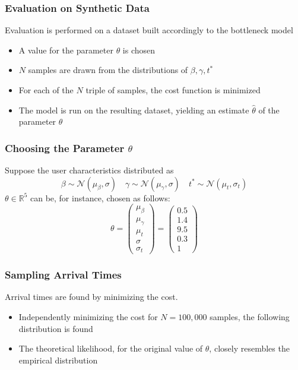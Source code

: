 \documentclass[hyperref={pdfpagelabels=false}]{beamer}
\begin{document}
\begin{frame}
  \tableofcontents[currentsection]
\end{frame}

\begin{frame}
  \frametitle{Evaluation on Synthetic Data}
  Evaluation is performed on a dataset built accordingly to the bottleneck model
  \begin{itemize}
  \item A value for the parameter \(\theta\) is chosen
  \item \(N\) samples are drawn from the distributions of \(\beta, \gamma, t^*\)
  \item For each of the \(N\) triple of samples, the cost function is minimized
  \item The model is run on the resulting dataset, yielding an estimate \(\hat{\theta}\) of the parameter \(\theta\)
  \end{itemize}
\end{frame}

\begin{frame}
  \frametitle{Choosing the Parameter $\theta$}
  Suppose the user characteristics distributed as
  \begin{equation*}
    \beta \sim \mathcal{N}(\mu_\beta, \sigma) \quad \gamma \sim \mathcal{N}(\mu_\gamma, \sigma) \quad t^* \sim \mathcal{N}(\mu_t, \sigma_t)
  \end{equation*}
  \(\theta \in \mathbb{R}^5\) can be, for instance, chosen as follows:
  \begin{equation*}
    \theta = \begin{pmatrix}
      \mu_\beta \\
      \mu_\gamma \\
      \mu_t \\
      \sigma \\
      \sigma_t
    \end{pmatrix}
    =
    \begin{pmatrix}
      0.5 \\
      1.4 \\
      9.5 \\
      0.3 \\
      1
    \end{pmatrix}
  \end{equation*}
\end{frame}

\begin{frame}
  \frametitle{Sampling Arrival Times}
  Arrival times are found by minimizing the cost.
  \begin{itemize}
  \item Independently minimizing the cost for \(N = 100,000\) samples, the following distribution is found
  \item<2-> The theoretical likelihood, for the original value of \(\theta\), closely resembles the empirical distribution
  \end{itemize}
  \centering
\end{frame}
\end{document}
